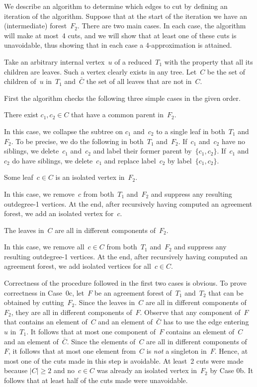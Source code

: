 We describe an algorithm to determine which edges to cut by defining an iteration of the algorithm. Suppose that at the start of the iteration we have an (intermediate) forest~$F_2$. There are two main cases. In each case, the algorithm will make at most~4 cuts, and we will show that at least one of these cuts is unavoidable, thus showing that in each case a 4-approximation is attained.

Take an arbitrary internal vertex~$u$ of {a reduced}~$T_1$ with the property that all its children are leaves. Such a vertex clearly exists in any tree. Let~$C$ be the set of children of~$u$ in~$T_1$ and~$\bar{C}$ the set of all leaves that are not in~$C$.

First the algorithm checks the following three simple cases in the given order.

\smallskip

 There exist $c_1,c_2\in C$ that have a common parent in~$F_2$.

In this case, we collapse the subtree on $c_1$ and~$c_2$ to a single leaf in both~$T_1$ and~$F_2$. To be precise, we do the following in both~$T_1$ and~$F_2$. If~$c_1$ and~$c_2$ have no siblings, we delete~$c_1$ and~$c_2$ and label their former parent by~$\{c_1,c_2\}$. If~$c_1$ and~$c_2$ do have siblings, we delete~$c_1$ and replace label~$c_2$ by label~$\{c_1,c_2\}$.

\smallskip

 Some leaf~$c\in C$ is an isolated vertex in~$F_2$.

In this case, we remove~$c$ from both~$T_1$ and~$F_2$ and suppress any resulting outdegree-1 vertices. At the end, after recursively having computed an agreement forest, we add an isolated vertex for~$c$.

\smallskip

 The leaves in~$C$ are all in different components of~$F_2$. 

In this case, we remove all~$c\in C$ from both~$T_1$ and~$F_2$ and suppress any resulting outdegree-1 vertices. At the end, after recursively having computed an agreement forest, we add isolated vertices for all~$c\in C$.

\smallskip

Correctness of the procedure followed in the first two cases is obvious. To prove correctness in Case~0c, let~$F$ be an agreement forest of~$T_1$ and~$T_2$ that can be obtained by cutting~$F_2$. Since the leaves in~$C$ are all in different components of~$F_2$, they are all in different components of~$F$. Observe that any component of~$F$ that contains an element of~$C$ and an element of~$\bar{C}$ has to use the edge entering~$u$ in~$T_1$. It follows that at most one component of~$F$ contains an element of~$C$ and an element of~$\bar{C}$. Since the elements of~$C$ are all in different components of~$F$, it follows that at most one element from~$C$ is \emph{not} a singleton in~$F$. Hence, at most one of the cuts made in this step is avoidable. At least~2 cuts were made because $|C|\geq 2$ and no~$c\in C$ was already an isolated vertex in~$F_2$ by Case 0b. It follows that at least half of the cuts made were unavoidable.

